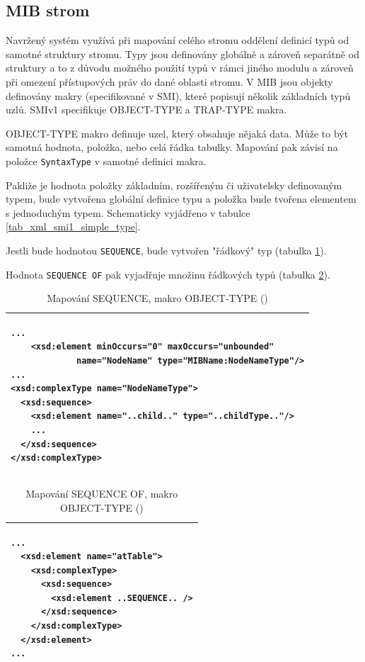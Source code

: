 \subsection{MIB strom}
Navržený systém využívá při mapování celého stromu oddělení definicí typů od samotné struktury stromu. Typy jsou definovány globálně a zároveň separátně od 
struktury a to z důvodu možného použití typů v rámci jiného modulu a zároveň při omezení přístupových práv do dané oblasti stromu. V MIB jsou objekty
definovány makry (specifikované v SMI), které popisují několik základních typů uzlů. SMIv1 specifikuje OBJECT-TYPE a TRAP-TYPE makra.

OBJECT-TYPE makro definuje uzel, který obsahuje nějaká data. Může to být samotná hodnota, položka, nebo celá řádka tabulky. Mapování pak závisí na
položce \verb|SyntaxType| v samotné definici makra.

Pakliže je hodnota položky základním, rozšířeným či uživatelsky definovaným typem, bude vytvořena globální definice typu a položka bude tvořena elementem
s jednoduchým typem. Schematicky vyjádřeno v tabulce \ref{tab_xml_smi1_simple_type}.

Jestli bude hodnotou \verb|SEQUENCE|, bude vytvořen "řádkový" typ (tabulka \ref{tab_xml_smi1_sequence}).

Hodnota \verb|SEQUENCE OF| pak vyjadřuje množinu řádkových typů (tabulka \ref{tab_xml_smi1_sequenceof}).


\begin{table}
	\centering
	{\footnotesize
	  \begin{tabular}{|p{15cm}|}
      \hline
\begin{verbatim}...
    <xsd:element minOccurs="0" maxOccurs="unbounded"
             name="NodeName" type="MIBName:NodeNameType"/>
...
<xsd:complexType name="NodeNameType">
  <xsd:sequence>
    <xsd:element name="..child.." type="..childType.."/>
    ...
  </xsd:sequence>
</xsd:complexType>\end{verbatim}\\
      \hline
    \end{tabular}
  }
	\caption{Mapování SEQUENCE, makro OBJECT-TYPE (\cite{macejko_dipl})}
	\label{tab_xml_smi1_sequence}
\end{table}

\begin{table}
	\centering
	{\footnotesize
	  \begin{tabular}{|p{15cm}|}
      \hline
\begin{verbatim}...
  <xsd:element name="atTable">
    <xsd:complexType>
      <xsd:sequence>
        <xsd:element ..SEQUENCE.. />
      </xsd:sequence>
    </xsd:complexType>
  </xsd:element>
...\end{verbatim}\\
      \hline
    \end{tabular}
  }
	\caption{Mapování SEQUENCE OF, makro OBJECT-TYPE (\cite{macejko_dipl})}
	\label{tab_xml_smi1_sequenceof}
\end{table}


